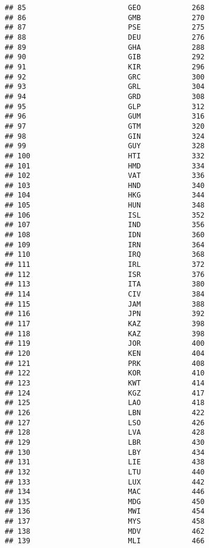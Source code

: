 \documentclass[
]{article}
\begin{document}
\begin{verbatim}
## 85                        GEO            268
## 86                        GMB            270
## 87                        PSE            275
## 88                        DEU            276
## 89                        GHA            288
## 90                        GIB            292
## 91                        KIR            296
## 92                        GRC            300
## 93                        GRL            304
## 94                        GRD            308
## 95                        GLP            312
## 96                        GUM            316
## 97                        GTM            320
## 98                        GIN            324
## 99                        GUY            328
## 100                       HTI            332
## 101                       HMD            334
## 102                       VAT            336
## 103                       HND            340
## 104                       HKG            344
## 105                       HUN            348
## 106                       ISL            352
## 107                       IND            356
## 108                       IDN            360
## 109                       IRN            364
## 110                       IRQ            368
## 111                       IRL            372
## 112                       ISR            376
## 113                       ITA            380
## 114                       CIV            384
## 115                       JAM            388
## 116                       JPN            392
## 117                       KAZ            398
## 118                       KAZ            398
## 119                       JOR            400
## 120                       KEN            404
## 121                       PRK            408
## 122                       KOR            410
## 123                       KWT            414
## 124                       KGZ            417
## 125                       LAO            418
## 126                       LBN            422
## 127                       LSO            426
## 128                       LVA            428
## 129                       LBR            430
## 130                       LBY            434
## 131                       LIE            438
## 132                       LTU            440
## 133                       LUX            442
## 134                       MAC            446
## 135                       MDG            450
## 136                       MWI            454
## 137                       MYS            458
## 138                       MDV            462
## 139                       MLI            466

\end{verbatim}
\end{document}
